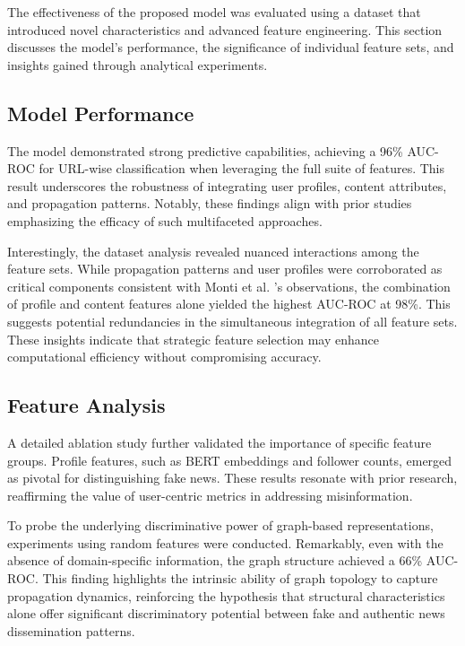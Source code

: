 \documentclass[sigconf,nonacm]{acmart}
\begin{document}
The effectiveness of the proposed model was evaluated using a dataset that introduced novel characteristics and advanced feature engineering. This section discusses the model's performance, the significance of individual feature sets, and insights gained through analytical experiments.

\subsection{Model Performance}

The model demonstrated strong predictive capabilities, achieving a 96\% AUC-ROC for URL-wise classification when leveraging the full suite of features. This result underscores the robustness of integrating user profiles, content attributes, and propagation patterns. Notably, these findings align with prior studies emphasizing the efficacy of such multifaceted approaches.

Interestingly, the dataset analysis revealed nuanced interactions among the feature sets. While propagation patterns and user profiles were corroborated as critical components consistent with Monti et al. \cite{monti2019fakenewsdetectionsocial}'s observations, the combination of profile and content features alone yielded the highest AUC-ROC at 98\%. This suggests potential redundancies in the simultaneous integration of all feature sets. These insights indicate that strategic feature selection may enhance computational efficiency without compromising accuracy.

\subsection{Feature Analysis}

A detailed ablation study further validated the importance of specific feature groups. Profile features, such as BERT embeddings and follower counts, emerged as pivotal for distinguishing fake news. These results resonate with prior research, reaffirming the value of user-centric metrics in addressing misinformation.

To probe the underlying discriminative power of graph-based representations, experiments using random features were conducted. Remarkably, even with the absence of domain-specific information, the graph structure achieved a 66\% AUC-ROC. This finding highlights the intrinsic ability of graph topology to capture propagation dynamics, reinforcing the hypothesis that structural characteristics alone offer significant discriminatory potential between fake and authentic news dissemination patterns.
\end{document}
